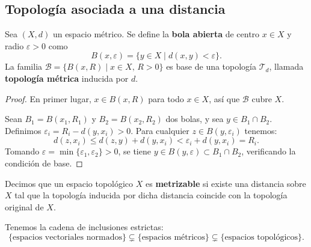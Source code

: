\subsection{Topología asociada a una distancia}

\begin{teorema}
    Sea $(X, d)$ un espacio métrico. Se define la \textbf{bola abierta} de centro $x \in X$ y radio $\varepsilon > 0$ como
    $$B(x, \varepsilon) = \{y \in X \mid d(x, y) < \varepsilon\}.$$
    La familia $\mathcal{B} = \{B(x, R) \mid x \in X,\, R > 0\}$ es base de una topología $\mathcal{T}_d$, llamada \textbf{topología métrica} inducida por $d$.
\end{teorema}
\begin{proof}
    En primer lugar, $x \in B(x, R)$ para todo $x \in X$, así que $\mathcal{B}$ cubre $X$.

    Sean $B_1 = B(x_1, R_1)$ y $B_2 = B(x_2, R_2)$ dos bolas, y sea $y \in B_1 \cap B_2$. Definimos $\varepsilon_i = R_i - d(y, x_i) > 0$. Para cualquier $z \in B(y, \varepsilon_i)$ tenemos:
    $$d(z, x_i) \leq d(z, y) + d(y, x_i) < \varepsilon_i + d(y, x_i) = R_i.$$
    Tomando $\varepsilon = \min\{\varepsilon_1, \varepsilon_2\} > 0$, se tiene $y \in B(y, \varepsilon) \subset B_1 \cap B_2$, verificando la condición de base.
\end{proof}

\begin{definición}
    Decimos que un espacio topológico $X$ es \textbf{metrizable} si existe una distancia sobre $X$ tal que la topología inducida por dicha distancia coincide con la topología original de $X$.
\end{definición}

\begin{observación}
    Tenemos la cadena de inclusiones estrictas:
    $$\{\text{espacios vectoriales normados}\} \subsetneq \{\text{espacios métricos}\} \subsetneq \{\text{espacios topológicos}\}.$$
\end{observación}



